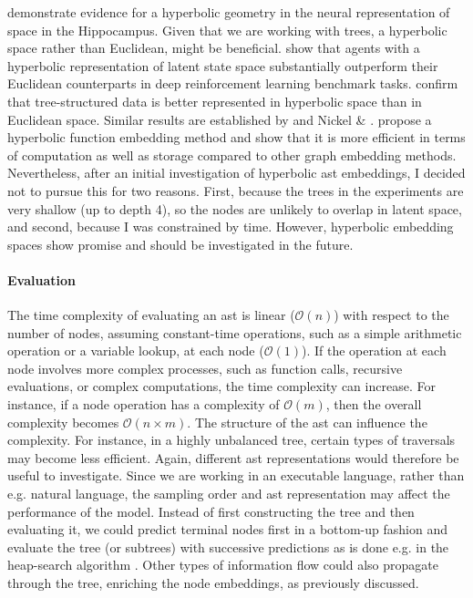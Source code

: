 \citet{zhangHippocampalSpatialRepresentations2023} demonstrate evidence for a hyperbolic geometry in the neural representation of space in the Hippocampus. Given that we are working with trees, a hyperbolic space rather than Euclidean, might be beneficial.
\citet{cetinHyperbolicDeepReinforcement2022} show that agents with a hyperbolic representation of latent state space substantially outperform their Euclidean counterparts in deep reinforcement learning benchmark tasks.
\citet{auyespekHyperbolicEmbeddingFinding} confirm that tree-structured data is better represented in hyperbolic space than in Euclidean space.
Similar results are established by \citet{khanHyperbolicRepresentationsSource} and Nickel \& \citet{nickelPoincareEmbeddingsLearning2017}.   
\citet{luHyperbolicFunctionEmbedding2019} propose a hyperbolic function embedding method and show that it is more efficient in terms of computation as well as storage compared to other graph embedding methods.
Nevertheless, after an initial investigation of hyperbolic \acrshort{ast} embeddings, I decided not to pursue this for two reasons. First, because the trees in the experiments are very shallow (up to depth 4), so the nodes are unlikely to overlap in latent space, and second, because I was constrained by time.
However, hyperbolic embedding spaces show promise and should be investigated in the future. 

\paragraph*{Evaluation}
The time complexity of evaluating an \acrshort{ast} is linear ($\mathcal{O}(n)$) with respect to the number of nodes, assuming constant-time operations, such as a simple arithmetic operation or a variable lookup, at each node ($\mathcal{O}(1)$). If the operation at each node involves more complex processes, such as function calls, recursive evaluations, or complex computations, the time complexity can increase. For instance, if a node operation has a complexity of $\mathcal{O}(m)$, then the overall complexity becomes $\mathcal{O}(n \times m)$.
The structure of the \acrshort{ast} can influence the complexity. For instance, in a highly unbalanced tree, certain types of traversals may become less efficient. Again, different \acrshort{ast} representations would therefore be useful to investigate. Since we are working in an executable language, rather than e.g. natural language, the sampling order and \acrshort{ast} representation may affect the performance of the model. Instead of first constructing the tree and then evaluating it, we could predict terminal nodes first in a bottom-up fashion and evaluate the tree (or subtrees) with successive predictions as is done e.g. in the heap-search algorithm \cite{fijalkowScalingNeuralProgram2021}. Other types of information flow could also propagate through the tree, enriching the node embeddings, as previously discussed.

